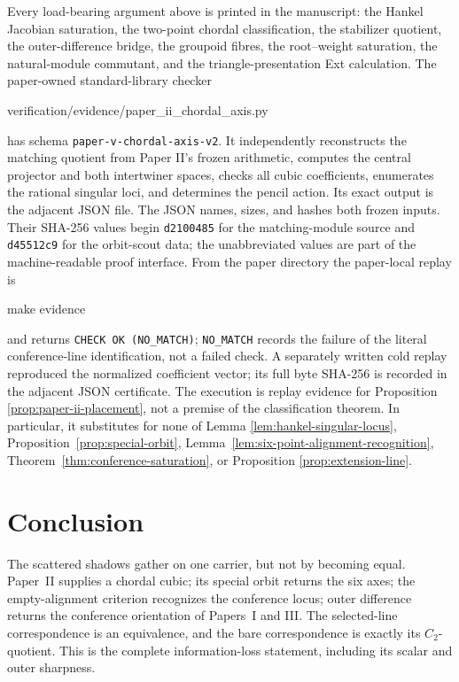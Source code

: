 \documentclass[11pt]{article}
\theoremstyle{definition}
\theoremstyle{remark}
\begin{document}
Every load-bearing argument above is printed in the manuscript: the Hankel
Jacobian saturation, the two-point chordal classification, the stabilizer
quotient, the outer-difference bridge, the groupoid fibres, the root--weight
saturation, the natural-module commutant, and the triangle-presentation Ext
calculation.  The paper-owned standard-library checker
\begin{center}
\small\ttfamily
verification/evidence/paper\_ii\_chordal\_axis.py
\end{center}
has schema \texttt{paper-v-chordal-axis-v2}.  It independently reconstructs the matching
quotient from Paper II's frozen arithmetic, computes the central projector
and both intertwiner spaces, checks all cubic coefficients, enumerates the
rational singular loci, and determines the pencil action.  Its exact output
is the adjacent JSON file.  The JSON names, sizes, and hashes both frozen
inputs.  Their SHA-256 values
begin \texttt{d2100485} for the matching-module source and
\texttt{d45512c9} for the orbit-scout data; the unabbreviated values are part
of the machine-readable proof interface.  From the paper directory the
paper-local replay is
\begin{center}
\small\ttfamily
make evidence
\end{center}
and returns \texttt{CHECK OK (NO\_MATCH)}; \texttt{NO\_MATCH} records the
failure of the literal conference-line identification, not a failed check.
A separately written cold replay reproduced the normalized coefficient
vector; its full byte SHA-256 is recorded in the adjacent JSON certificate.
The execution is replay evidence for Proposition
\ref{prop:paper-ii-placement}, not a premise of the classification theorem.
In particular, it substitutes for none of Lemma
\ref{lem:hankel-singular-locus}, Proposition~\ref{prop:special-orbit},
Lemma~\ref{lem:six-point-alignment-recognition},
Theorem~\ref{thm:conference-saturation}, or Proposition
\ref{prop:extension-line}.

\section{Conclusion}
\label{sec:conclusion}

The scattered shadows gather on one carrier, but not by becoming equal.
Paper~II supplies a chordal cubic; its special orbit returns the six axes;
the empty-alignment criterion recognizes the conference locus; outer
difference returns the conference orientation of Papers~I and III.
The selected-line correspondence is an equivalence, and the bare
correspondence is exactly its \(C_2\)-quotient.  This is the complete
information-loss statement, including its scalar and outer sharpness.
\end{document}
